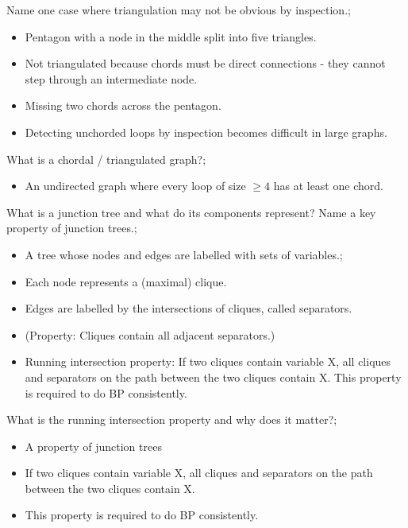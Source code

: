 \documentclass{article}
\begin{document}
Name one case where triangulation may not be obvious by inspection.; \begin{itemize}
    \item Pentagon with a node in the middle split into five triangles.
    \item Not triangulated because chords must be direct connections - they cannot step through an intermediate node.
    \item Missing two chords across the pentagon.
    \item Detecting unchorded loops by inspection becomes difficult in large graphs.
\end{itemize}

What is a chordal / triangulated graph?; \begin{itemize}
    \item An undirected graph where every loop of size $\geq 4$ has at least one chord.
\end{itemize}

What is a junction tree and what do its components represent? Name a key property of junction trees.;\begin{itemize}
    \item  A tree whose nodes and edges are labelled with sets of variables.;
    \item Each node represents a (maximal) clique.
    \item Edges are labelled by the intersections of cliques, called separators.
    \item (Property: Cliques contain all adjacent separators.)
    \item Running intersection property: If two cliques contain variable X, all cliques and separators on the path between the two cliques contain X. This property is required to do BP consistently.
\end{itemize}

What is the running intersection property and why does it matter?; \begin{itemize}
    \item A property of junction trees
    \item If two cliques contain variable X, all cliques and separators on the path between the two cliques contain X.
    \item This property is required to do BP consistently.
\end{itemize}
\end{document}
